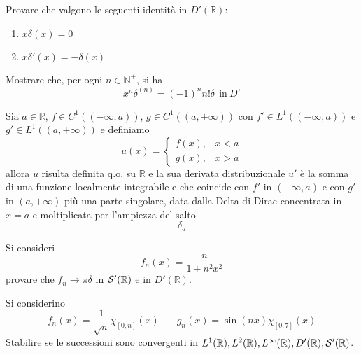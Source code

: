 Provare che valgono le seguenti identità in $D'(\mathbb{R})$:
\begin{enumerate}
\item $x\delta ( x) =0$
\item $x\delta '( x) =-\delta ( x)$
\end{enumerate}

Mostrare che, per ogni $n\in \mathbb{N}^{+}$, si ha
\begin{equation*}
\boxed{x^{n} \delta ^{( n)} =( -1)^{n} n!\delta \ \ \text{in} \ D'}
\end{equation*}

Sia $a\in \mathbb{R}$, $f\in C^{1}(( -\infty ,a))$, $g\in C^{1}(( a,+\infty ))$ con $f'\in L^{1}(( -\infty ,a))$ e $g'\in L^{1}(( a,+\infty ))$ e definiamo
\begin{equation*}
u( x) =\begin{cases}
f( x) , & x< a\\
g( x) , & x >a
\end{cases}
\end{equation*}
allora $u$ risulta definita q.o. su $\mathbb{R}$ e la sua derivata distribuzionale $u'$ è la somma di una funzione localmente integrabile e che coincide con $f'$ in $( -\infty ,a)$ e con $g'$ in $( a,+\infty )$ più una parte singolare, data dalla Delta di Dirac concentrata in $x=a$ e moltiplicata per l'ampiezza del salto
\begin{equation*}
[ u( a_{+}) -u( a_{-})] \delta _{a}
\end{equation*}
\Esercizio{}

Si consideri
\begin{equation*}
f_{n}( x) =\frac{n}{1+n^{2} x^{2}}
\end{equation*}
provare che $f_{n}\rightarrow \pi \delta $ in $\mathcal{S}  '(\mathbb{R})$ e in $D'(\mathbb{R})$.
\Esercizio{}

Si considerino
\begin{equation*}
f_{n}( x) =\frac{1}{\sqrt{n}} \chi _{[ 0,n]}( x) \ \ \ \ \ \ \ \ g_{n}( x) =\sin( nx) \chi _{[ 0,7]}( x)
\end{equation*}
Stabilire se le successioni sono convergenti in $L^{1}(\mathbb{R}) ,L^{2}(\mathbb{R}) ,L^{\infty }(\mathbb{R}) ,D'(\mathbb{R}) ,\mathcal{S}  '(\mathbb{R})$.
\Esercizio{}


